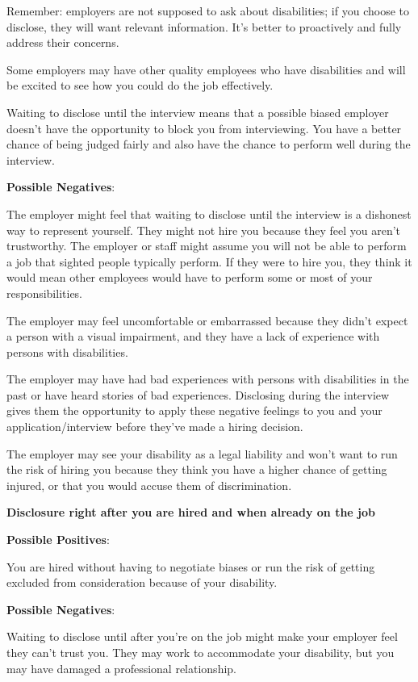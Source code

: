 Remember: employers are not supposed to ask about disabilities; if you choose to disclose, they will want relevant information. It's better to proactively and fully address their concerns.

Some employers may have other quality employees who have disabilities and will be excited to see how you could do the job effectively.

Waiting to disclose until the interview means that a possible biased employer doesn't have the opportunity to block you from interviewing. You have a better chance of being judged fairly and also have the chance to perform well during the interview.

\textbf{Possible Negatives}:

The employer might feel that waiting to disclose until the interview is a dishonest way to represent yourself. They might not hire you because they feel you aren't trustworthy.
The employer or staff might assume you will not be able to perform a job that sighted people typically perform. If they were to hire you, they think it would mean other employees would have to perform some or most of your responsibilities.

The employer may feel uncomfortable or embarrassed because they didn't expect a person with a visual impairment, and they have a lack of experience with persons with disabilities.

The employer may have had bad experiences with persons with disabilities in the past or have heard stories of bad experiences. Disclosing during the interview gives them the opportunity to apply these negative feelings to you and your application/interview before they've made a hiring decision.

The employer may see your disability as a legal liability and won't want to run the risk of hiring you because they think you have a higher chance of getting injured, or that you would accuse them of discrimination.

\textbf{Disclosure right after you are hired and when already on the job}

\textbf{Possible Positives}:

You are hired without having to negotiate biases or run the risk of getting excluded from consideration because of your disability.

\textbf{Possible Negatives}:

Waiting to disclose until after you're on the job might make your employer feel they can't trust you. They may work to accommodate your disability, but you may have damaged a professional relationship.

